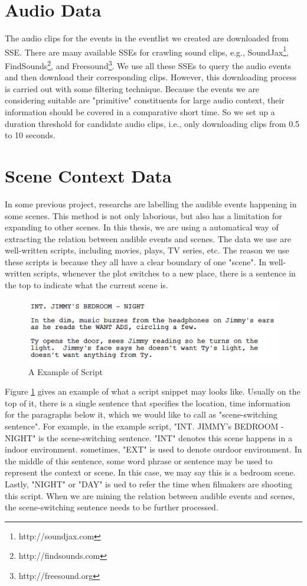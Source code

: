 \section{Audio Data}
The audio clips for the events in the eventlist we created are downloaded from SSE. 
There are many available SSEs for crawling sound clips, e.g., SoundJax\footnote{http://soundjax.com}, FindSounds\footnote{http://findsounds.com}, and Freesound\footnote{http://freesound.org}. 
We use all these SSEs to query the audio events and then download their corresponding clips. 
However, this downloading process is carried out with some filtering technique. 
Because the events we are considering suitable are "primitive" constituents for large audio context, their information should be covered in a comparative short time. 
So we set up a duration threshold for candidate audio clips, i.e., only downloading clips from 0.5 to 10 seconds.  

\section{Scene Context Data}
In some previous project, researchs are labelling the audible events happening in some scenes. 
This method is not only laborious, but also has a limitation for expanding to other scenes.
In this thesis, we are using a automatical way of extracting the relation between audible events and scenes.
The data we use are well-written scripts, including movies, plays, TV series, etc. 
The reason we use these scripts is because they all have a clear boundary of one "scene". 
In well-written scripts, whenever the plot switches to a new place, there is a sentence in the top to indicate what the current scene is. 
\begin{figure}[htb]
\centering
\includegraphics[scale=0.6]{figure/dataprep/script}
\caption{A Example of Script}
\label{fig:script}
\end{figure}

Figure \ref{fig:script} gives an example of what a script snippet may looks like. Usually on the top of it, there is a single sentence that specifies the location, time information for the paragraphs below it, which we would like to call as "scene-switching sentence". 
For example, in the example script, "INT. JIMMY's BEDROOM - NIGHT" is the scene-switching sentence. 
"INT" denotes this scene happens in a indoor environment. 
sometimes, "EXT" is used to denote ourdoor environment. 
In the middle of this sentence, some word phrase or sentence may be used to represent the context or scene. 
In this case, we may say this is a bedroom scene. 
Lastly, "NIGHT" or "DAY" is ued to refer the time when filmakers are shooting this script. 
When we are mining the relation between audible events and scenes, the scene-switching sentence needs to be further processed. 

